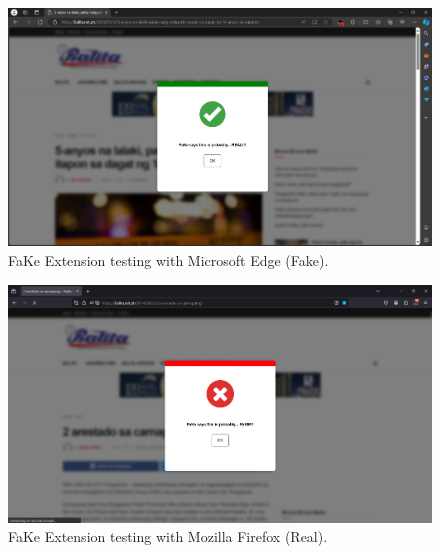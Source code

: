        \begin{figure}[h!]
            \centering
            \includegraphics[width=1\textwidth,height=1\textheight, keepaspectratio]{figures/Screenshots/edge-true-negative.png}
            \caption{FaKe Extension testing with Microsoft Edge (Fake).}
            \label{fig:fake-edge-test}
        \end{figure}

        \begin{figure}[h!]
            \centering
            \includegraphics[width=1\textwidth,height=1\textheight, keepaspectratio]{figures/Screenshots/firefox-true-positive.png}
            \caption{FaKe Extension testing with Mozilla Firefox (Real).}
            \label{fig:real-firefox-test}
        \end{figure}

